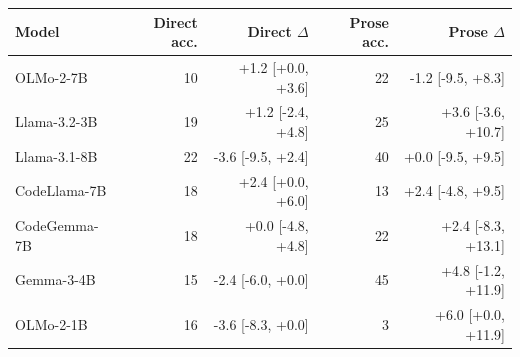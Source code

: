 \begin{tabular}{@{}lrrrr@{}}
\toprule
Model & Direct acc. & Direct $\Delta$ & Prose acc. & Prose $\Delta$ \\
\midrule
OLMo-2-7B & 10 & +1.2 [+0.0, +3.6] & 22 & -1.2 [-9.5, +8.3] \\
Llama-3.2-3B & 19 & +1.2 [-2.4, +4.8] & 25 & +3.6 [-3.6, +10.7] \\
Llama-3.1-8B & 22 & -3.6 [-9.5, +2.4] & 40 & +0.0 [-9.5, +9.5] \\
CodeLlama-7B & 18 & +2.4 [+0.0, +6.0] & 13 & +2.4 [-4.8, +9.5] \\
CodeGemma-7B & 18 & +0.0 [-4.8, +4.8] & 22 & +2.4 [-8.3, +13.1] \\
Gemma-3-4B & 15 & -2.4 [-6.0, +0.0] & 45 & +4.8 [-1.2, +11.9] \\
OLMo-2-1B & 16 & -3.6 [-8.3, +0.0] & 3 & +6.0 [+0.0, +11.9] \\
\bottomrule
\end{tabular}
